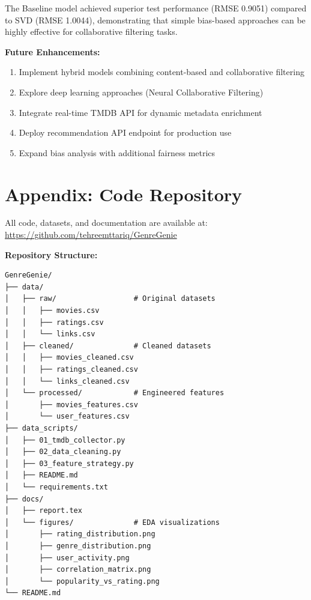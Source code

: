 \documentclass[11pt,a4paper]{article}
\begin{document}
The Baseline model achieved superior test performance (RMSE 0.9051) compared to SVD (RMSE 1.0044), demonstrating that simple bias-based approaches can be highly effective for collaborative filtering tasks.

\textbf{Future Enhancements:}

\begin{enumerate}
    \item Implement hybrid models combining content-based and collaborative filtering
    \item Explore deep learning approaches (Neural Collaborative Filtering)
    \item Integrate real-time TMDB API for dynamic metadata enrichment
    \item Deploy recommendation API endpoint for production use
    \item Expand bias analysis with additional fairness metrics
\end{enumerate}


\section*{Appendix: Code Repository}
All code, datasets, and documentation are available at: \\
\url{https://github.com/tehreemttariq/GenreGenie}

\textbf{Repository Structure:}
\begin{verbatim}
GenreGenie/
├── data/
│   ├── raw/                  # Original datasets
│   │   ├── movies.csv
│   │   ├── ratings.csv
│   │   └── links.csv
│   ├── cleaned/              # Cleaned datasets
│   │   ├── movies_cleaned.csv
│   │   ├── ratings_cleaned.csv
│   │   └── links_cleaned.csv
│   └── processed/            # Engineered features
│       ├── movies_features.csv
│       └── user_features.csv
├── data_scripts/
│   ├── 01_tmdb_collector.py
│   ├── 02_data_cleaning.py
│   ├── 03_feature_strategy.py
│   ├── README.md
│   └── requirements.txt
├── docs/
│   ├── report.tex
│   └── figures/              # EDA visualizations
│       ├── rating_distribution.png
│       ├── genre_distribution.png
│       ├── user_activity.png
│       ├── correlation_matrix.png
│       └── popularity_vs_rating.png
└── README.md
\end{verbatim}
\end{document}
